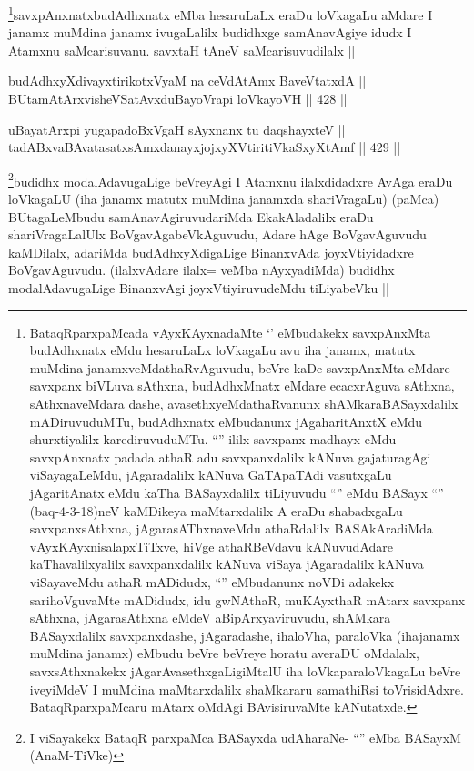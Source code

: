 \begin{artha}
\footnote{BataqRparxpaMcada vAyxKAyxnadaMte `\stext' eMbudakekx savxpAnxMta budAdhxnatx eMdu hesaruLaLx loVkagaLu avu iha janamx, matutx muMdina janamxveMdathaRvAguvudu, beVre kaDe savxpAnxMta eMdare savxpanx biVLuva sAthxna, budAdhxMnatx eMdare ecacxrAguva sAthxna, sAthxnaveMdara dashe, avasethxyeMdathaRvanunx shAMkaraBASayxdalilx mADiruvuduMTu, budAdhxnatx eMbudanunx jAgaharitAnxtX eMdu shurxtiyalilx karediruvuduMTu. ``\stext'' ililx savxpanx madhayx eMdu savxpAnxnatx padada athaR adu savxpanxdalilx kANuva gajaturagAgi viSayagaLeMdu, jAgaradalilx kANuva GaTApaTAdi vasutxgaLu jAgaritAnatx eMdu kaTha BASayxdalilx tiLiyuvudu ``\stext'' eMdu BASayx ``\stext'' (baq-4-3-18)neV kaMDikeya maMtarxdalilx A eraDu shabadxgaLu savxpanxsAthxna, jAgarasAThxnaveMdu athaRdalilx BASAkAradiMda vAyxKAyxnisalapxTiTxve, hiVge athaRBeVdavu kANuvudAdare kaThavalilxyalilx savxpanxdalilx kANuva viSaya jAgaradalilx kANuva viSayaveMdu athaR mADidudx, ``\stext'' eMbudanunx noVDi adakekx sarihoVguvaMte mADidudx, idu gwNAthaR, muKAyxthaR mAtarx savxpanx sAthxna, jAgarasAthxna eMdeV aBipArxyaviruvudu, shAMkara BASayxdalilx savxpanxdashe, jAgaradashe, ihaloVha, paraloVka (ihajanamx muMdina janamx) eMbudu beVre beVreye horatu averaDU oMdalalx, savxsAthxnakekx jAgarAvasethxgaLigiMtalU iha loVkaparaloVkagaLu beVre iveyiMdeV I muMdina maMtarxdalilx shaMkararu samathiRsi toVrisidAdxre. BataqRparxpaMcaru mAtarx oMdAgi BAvisiruvaMte kANutatxde.}savxpAnxnatxbudAdhxnatx eMba hesaruLaLx eraDu loVkagaLu aMdare I janamx muMdina janamx ivugaLalilx budidhxge samAnavAgiye idudx I Atamxnu saMcarisuvanu. savxtaH tAneV saMcarisuvudilalx ||
\end{artha}

\begin{shl}
budAdhxyXdivayxtirikotxV\s yaM na ceVdAtAmx BaveVtatxdA || \\
BUtamAtArxvisheVSatAvxduBayoVrapi loVkayoVH ||  428 ||  
\end{shl}
				
\begin{shl}
uBayatArxpi yugapadoBxVgaH sAyxnanx tu daqshayxteV || \\
tadABxvaBAvatasatxsAmxdanayxjojxyXVtiritiVkaSxyXtAmf ||  429 ||  
\end{shl}

\begin{artha}
\footnote{I viSayakekx BataqR parxpaMca BASayxda udAharaNe- ``\stext'' eMba BASayxM (AnaM-TiVke)}budidhx modalAdavugaLige beVreyAgi I Atamxnu ilalxdidadxre AvAga eraDu loVkagaLU (iha janamx matutx muMdina janamxda shariVragaLu) (paMca) BUtagaLeMbudu samAnavAgiruvudariMda EkakAladalilx eraDu shariVragaLalUlx BoVgavAgabeVkAguvudu, Adare hAge BoVgavAguvudu kaMDilalx, adariMda budAdhxyXdigaLige BinanxvAda joyxVtiyidadxre BoVgavAguvudu. (ilalxvAdare ilalx= veMba nAyxyadiMda) budidhx modalAdavugaLige BinanxvAgi joyxVtiyiruvudeMdu tiLiyabeVku ||
\end{artha}

